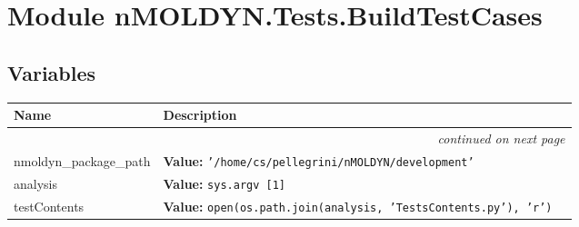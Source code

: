 %
%
%


\section{Module nMOLDYN.Tests.BuildTestCases}

    \label{nMOLDYN:Tests:BuildTestCases}


  \subsection{Variables}

    \vspace{-1cm}
\hspace{\varindent}\begin{longtable}{|p{\varnamewidth}|p{\vardescrwidth}|l}
\cline{1-2}
\cline{1-2} \centering \textbf{Name} & \centering \textbf{Description}& \\
\cline{1-2}
\endhead\cline{1-2}\multicolumn{3}{r}{\small\textit{continued on next page}}\\\endfoot\cline{1-2}
\endlastfoot\raggedright n\-m\-o\-l\-d\-y\-n\-\_\-p\-a\-c\-k\-a\-g\-e\-\_\-p\-a\-t\-h\- & \raggedright \textbf{Value:} 
{\tt '/home/cs/pellegrini/nMOLDYN/development'}&\\
\cline{1-2}
\raggedright a\-n\-a\-l\-y\-s\-i\-s\- & \raggedright \textbf{Value:} 
{\tt sys.argv [1]}&\\
\cline{1-2}
\raggedright t\-e\-s\-t\-C\-o\-n\-t\-e\-n\-t\-s\- & \raggedright \textbf{Value:} 
{\tt open(os.path.join(analysis, 'TestsContents.py'), 'r')}&\\
\cline{1-2}
\end{longtable}

